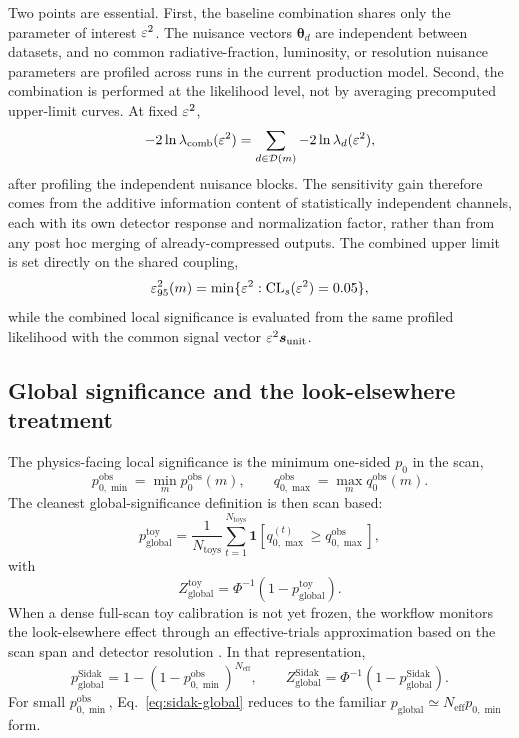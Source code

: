 Two points are essential. First, the baseline combination shares only the parameter of
interest $\varepsilon^2$. The nuisance vectors $\bm{\theta}_d$ are independent between
datasets, and no common radiative-fraction, luminosity, or resolution nuisance
parameters are profiled across runs in the current production model. Second, the
combination is performed at the likelihood level, not by averaging precomputed
upper-limit curves. At fixed $\varepsilon^2$,
\begin{equation}
-2\ln\lambda_{\mathrm{comb}}(\varepsilon^2)
=
\sum_{d \in \mathcal{D}(m)} -2\ln\lambda_d(\varepsilon^2),
\end{equation}
after profiling the independent nuisance blocks. The sensitivity gain therefore comes
from the additive information content of statistically independent channels, each with
its own detector response and normalization factor, rather than from any post hoc
merging of already-compressed outputs. The combined upper limit is set directly on the
shared coupling,
\begin{equation}
\varepsilon^2_{95}(m) = \min\{\varepsilon^2 : \mathrm{CL}_s(\varepsilon^2)=0.05\},
\end{equation}
while the combined local significance is evaluated from the same profiled likelihood
with the common signal vector $\varepsilon^2 \bm{s}_{\mathrm{unit}}$.

\subsection{Global significance and the look-elsewhere treatment}

The physics-facing local significance is the minimum one-sided $p_0$ in the scan,
\begin{equation}
p_{0,\min}^{\mathrm{obs}} = \min_m p_0^{\mathrm{obs}}(m),
\qquad
q_{0,\max}^{\mathrm{obs}} = \max_m q_0^{\mathrm{obs}}(m).
\end{equation}
The cleanest global-significance definition is then scan based:
\begin{equation}
p_{\mathrm{global}}^{\mathrm{toy}}
=
\frac{1}{N_{\mathrm{toys}}}
\sum_{t=1}^{N_{\mathrm{toys}}}
\mathbf{1}\!\left[
q_{0,\max}^{(t)} \ge q_{0,\max}^{\mathrm{obs}}
\right],
\label{eq:pglobal-toy}
\end{equation}
with
\begin{equation}
Z_{\mathrm{global}}^{\mathrm{toy}} = \Phi^{-1}\!\left(1-p_{\mathrm{global}}^{\mathrm{toy}}\right).
\end{equation}
When a dense full-scan toy calibration is not yet frozen, the workflow monitors the
look-elsewhere effect through an effective-trials approximation based on the scan span
and detector resolution \cite{GrossVitells2010}. In that representation,
\begin{equation}
p_{\mathrm{global}}^{\mathrm{Sidak}}
=
1-\left(1-p_{0,\min}^{\mathrm{obs}}\right)^{N_{\mathrm{eff}}},
\qquad
Z_{\mathrm{global}}^{\mathrm{Sidak}}
=
\Phi^{-1}\!\left(1-p_{\mathrm{global}}^{\mathrm{Sidak}}\right).
\label{eq:sidak-global}
\end{equation}
For small $p_{0,\min}^{\mathrm{obs}}$, Eq.~\eqref{eq:sidak-global} reduces to the
familiar $p_{\mathrm{global}}\simeq N_{\mathrm{eff}}p_{0,\min}$ form.

